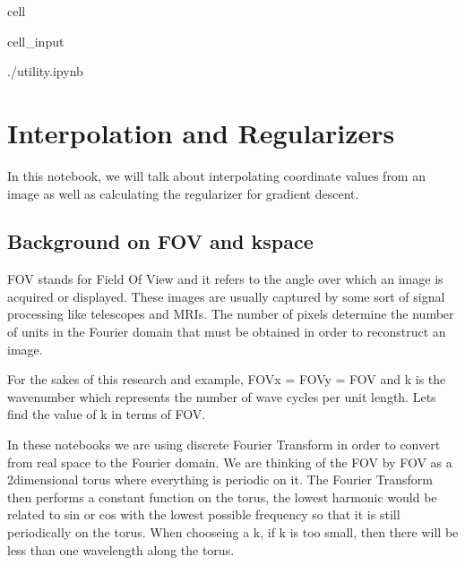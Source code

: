 \documentclass[letterpaper,10pt,english]{jupyterBook}
\begin{document}
\begin{sphinxuseclass}{cell}\begin{sphinxVerbatimInput}

\begin{sphinxuseclass}{cell_input}
\begin{sphinxVerbatim}[commandchars=\\\{\}]
 ./utility.ipynb
\end{sphinxVerbatim}

\end{sphinxuseclass}\end{sphinxVerbatimInput}

\end{sphinxuseclass}

\chapter{Interpolation and Regularizers}
\label{\detokenize{interpolation:interpolation-and-regularizers}}\label{\detokenize{interpolation::doc}}
\sphinxAtStartPar
In this notebook, we will talk about interpolating coordinate values from an image as well as calculating the regularizer
for gradient descent.


\section{Background on FOV and k\sphinxhyphen{}space}
\label{\detokenize{interpolation:background-on-fov-and-k-space}}
\sphinxAtStartPar
FOV stands for Field Of View and it refers to the angle over which an image is acquired or displayed. These images are usually captured by some sort of signal processing like telescopes and MRIs. The number of pixels determine the number of units in the Fourier domain that must be obtained in order to reconstruct an image.

\sphinxAtStartPar
For the sakes of this research and example, FOVx = FOVy = FOV and k is the wavenumber which represents the number of wave cycles per unit length. Lets find the value of k in terms of FOV.

\sphinxAtStartPar
In these notebooks we are using discrete Fourier Transform in order to convert from real space to the Fourier domain. We are thinking of the FOV by FOV as a 2\sphinxhyphen{}dimensional torus where everything is periodic on it. The Fourier Transform then performs a constant function on the torus, the lowest harmonic would be related to sin or cos with the lowest possible frequency so that it is still periodically on the torus. When chooseing a k, if k is too small, then there will be less than one wavelength along the torus.
\end{document}

